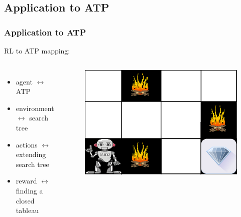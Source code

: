 \documentclass{beamer}
\begin{document}
\subsection{Application to ATP}
\begin{frame}
    \frametitle{Application to ATP}
    RL to ATP mapping:
    \begin{columns}
    \begin{itemize}
        \item agent $\leftrightarrow$ ATP
        \item environment $\leftrightarrow$ search tree
        \item actions $\leftrightarrow$ extending search tree
        \item reward $\leftrightarrow$ finding a closed tableau
    \end{itemize}
    \begin{figure}
    \includegraphics[width=\linewidth]{RL_robot.png}
    \end{figure}
    \end{columns}
\end{frame}
\end{document}
